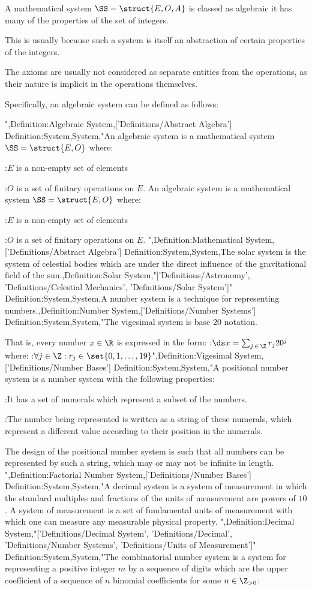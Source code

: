 A mathematical system $\SS = \struct {E, O, A}$ is classed as algebraic  it has many of the properties of the set of integers.

This is usually because such a system is itself an abstraction of certain properties of the integers.

The axioms are usually not considered as separate entities from the operations, as their nature is implicit in the operations themselves.


Specifically, an algebraic system can be defined as follows:

",Definition:Algebraic System,['Definitions/Abstract Algebra']
Definition:System,System,"An algebraic system is a mathematical system $\SS = \struct {E, O}$ where:

:$E$ is a non-empty set of elements

:$O$ is a set of finitary operations on $E$.
An algebraic system is a mathematical system $\SS = \struct {E, O}$ where:

:$E$ is a non-empty set of elements

:$O$ is a set of finitary operations on $E$.
",Definition:Mathematical System,['Definitions/Abstract Algebra']
Definition:System,System,The solar system is the system of celestial bodies which are under the direct influence of the gravitational field of the sun.,Definition:Solar System,"['Definitions/Astronomy', 'Definitions/Celestial Mechanics', 'Definitions/Solar System']"
Definition:System,System,A number system is a technique for representing numbers.,Definition:Number System,['Definitions/Number Systems']
Definition:System,System,"The vigesimal system is base $20$ notation.

That is, every number $x \in \R$ is expressed in the form:
:$\ds x = \sum_{j \mathop \in \Z} r_j 20^j$
where:
:$\forall j \in \Z: r_j \in \set {0, 1, \ldots, 19}$",Definition:Vigesimal System,['Definitions/Number Bases']
Definition:System,System,"A positional number system is a number system with the following properties:

:It has a set of numerals which represent a subset of the numbers.

:The number being represented is written as a string of these numerals, which represent a different value according to their position in the numerals.

The design of the positional number system is such that all numbers can be represented by such a string, which may or may not be infinite in length.
",Definition:Factorial Number System,['Definitions/Number Bases']
Definition:System,System,"A decimal system is a system of measurement in which the standard multiples and fractions of the units of measurement are powers of $10$.
A system of measurement is a set of fundamental units of measurement with which one can measure any measurable physical property.
",Definition:Decimal System,"['Definitions/Decimal System', 'Definitions/Decimal', 'Definitions/Number Systems', 'Definitions/Units of Measurement']"
Definition:System,System,"The combinatorial number system is a system for representing a positive integer $m$ by a sequence of digits which are the upper coefficient of a sequence of $n$ binomial coefficients for some $n \in \Z_{>0}$:

